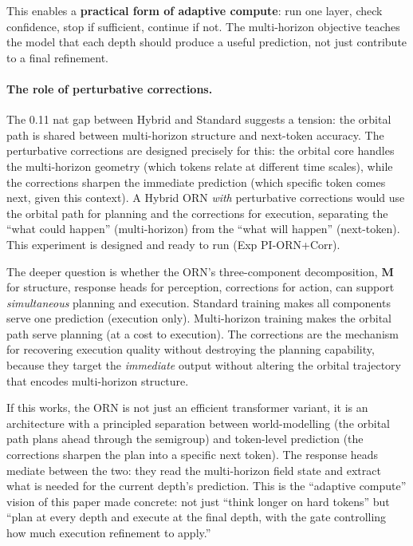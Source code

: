 \documentclass[11pt, a4paper]{article}
\newcommand{\M}{\mathbf{M}}
\theoremstyle{plain}
\theoremstyle{definition}
\theoremstyle{remark}
\begin{document}
This enables a \textbf{practical form of adaptive compute}: run one layer, check confidence, stop if sufficient, continue if not.
The multi-horizon objective teaches the model that each depth should produce a useful prediction, not just contribute to a final refinement.

\paragraph{The role of perturbative corrections.}
The 0.11 nat gap between Hybrid and Standard suggests a tension: the orbital path is shared between multi-horizon structure and next-token accuracy.
The perturbative corrections are designed precisely for this: the orbital core handles the multi-horizon geometry (which tokens relate at different time scales), while the corrections sharpen the immediate prediction (which specific token comes next, given this context).
A Hybrid ORN \emph{with} perturbative corrections would use the orbital path for planning and the corrections for execution, separating the ``what could happen'' (multi-horizon) from the ``what will happen'' (next-token).
This experiment is designed and ready to run (Exp PI-ORN+Corr).

The deeper question is whether the ORN's three-component decomposition, $\M$ for structure, response heads for perception, corrections for action, can support \emph{simultaneous} planning and execution.
Standard training makes all components serve one prediction (execution only).
Multi-horizon training makes the orbital path serve planning (at a cost to execution).
The corrections are the mechanism for recovering execution quality without destroying the planning capability, because they target the \emph{immediate} output without altering the orbital trajectory that encodes multi-horizon structure.

If this works, the ORN is not just an efficient transformer variant, it is an architecture with a principled separation between world-modelling (the orbital path plans ahead through the semigroup) and token-level prediction (the corrections sharpen the plan into a specific next token).
The response heads mediate between the two: they read the multi-horizon field state and extract what is needed for the current depth's prediction.
This is the ``adaptive compute'' vision of this paper made concrete: not just ``think longer on hard tokens'' but ``plan at every depth and execute at the final depth, with the gate controlling how much execution refinement to apply.''
\end{document}
